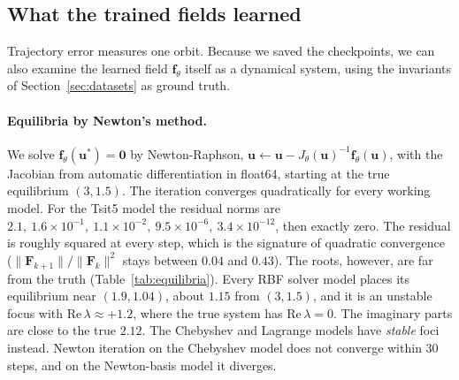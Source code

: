 \subsection{What the trained fields learned}
\label{sec:numerics}

Trajectory error measures one orbit. Because we saved the checkpoints, we
can also examine the learned field $\mathbf{f}_\theta$ itself as a dynamical
system, using the invariants of Section~\ref{sec:datasets} as ground truth.

\paragraph{Equilibria by Newton's method.} We solve
$\mathbf{f}_\theta(\mathbf{u}^\ast)=\mathbf{0}$ by Newton-Raphson,
$\mathbf{u}\leftarrow\mathbf{u}-J_\theta(\mathbf{u})^{-1}\mathbf{f}_\theta(\mathbf{u})$,
with the Jacobian from automatic differentiation in float64, starting at the
true equilibrium $(3,1.5)$. The iteration converges quadratically for every
working model. For the Tsit5 model the residual norms are
$2.1,\ 1.6\times10^{-1},\ 1.1\times10^{-2},\ 9.5\times10^{-6},\ 3.4\times10^{-12}$,
then exactly zero. The residual is roughly squared at every step, which is
the signature of quadratic convergence ($\|\mathbf{F}_{k+1}\|/\|\mathbf{F}_k\|^2$
stays between $0.04$ and $0.43$). The roots, however, are far from the truth
(Table~\ref{tab:equilibria}). Every RBF solver model places its equilibrium
near $(1.9,1.04)$, about $1.15$ from $(3,1.5)$, and it is an unstable focus
with $\mathrm{Re}\,\lambda\approx+1.2$, where the true system has
$\mathrm{Re}\,\lambda=0$. The imaginary parts are close to the true $2.12$.
The Chebyshev and Lagrange models have \emph{stable} foci instead. Newton
iteration on the Chebyshev model does not converge within 30 steps, and on
the Newton-basis model it diverges.

